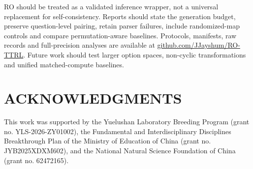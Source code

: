 \documentclass{article}
\begin{document}
RO should be treated as a validated inference wrapper, not a universal replacement for self-consistency. Reports should state the generation budget, preserve question-level pairing, retain parser failures, include randomized-map controls and compare permutation-aware baselines. Protocols, manifests, raw records and full-precision analyses are available at \href{https://github.com/JJayshum/RO-TTRL}{github.com/JJayshum/RO-TTRL}. Future work should test larger option spaces, non-cyclic transformations and unified matched-compute baselines.

\clearpage
\section*{ACKNOWLEDGMENTS}
This work was supported by the Yuelushan Laboratory Breeding Program (grant no. YLS-2026-ZY01002), the Fundamental and Interdisciplinary Disciplines Breakthrough Plan of the Ministry of Education of China (grant no. JYB2025XDXM602), and the National Natural Science Foundation of China (grant no. 62472165).

\makeatletter
\let\rooldthebibliography\thebibliography
\renewcommand{\thebibliography}[1]{%
  \rooldthebibliography{#1}%
  \setlength{\itemsep}{0pt}%
  \setlength{\parsep}{0pt}%
}
\makeatother


\end{document}
